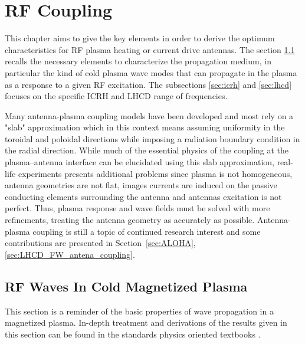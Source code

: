 \setchapterpreamble[u]{\margintoc}
\chapter{RF Coupling}
\label{chap:rf_coupling}


This chapter aims to give the key elements in order to derive the optimum characteristics for RF plasma heating or current drive antennas. The section \ref{sec:waves-in-plasma} recalls the necessary elements to characterize the propagation medium, in particular the kind of cold plasma wave modes that can propagate in the plasma as a response to a given RF excitation. The subsections \ref{sec:icrh} and \ref{sec:lhcd} focuses on the specific ICRH and LHCD range of frequencies. 

Many antenna-plasma coupling models have been developed and most rely on a "slab" approximation which in this context means assuming uniformity in the toroidal and poloidal directions while imposing a radiation boundary condition in the radial direction. While much of the essential physics of the coupling at the plasma–antenna interface can be elucidated using this slab approximation, real-life experiments presents additional problems since plasma is not homogeneous, antenna geometries are not flat, images currents are induced on the passive conducting elements surrounding the antenna and antennas excitation is not perfect. Thus, plasma response and wave fields must be solved with more refinements, treating the antenna geometry as accurately as possible. Antenna-plasma coupling is still a topic of continued research interest and some contributions are presented in Section~\ref{sec:ALOHA}, \ref{sec:LHCD_FW_antena_coupling}.


\section{RF Waves In Cold Magnetized Plasma}\label{sec:waves-in-plasma}
This section is a reminder of the basic properties of wave propagation in a magnetized plasma. In-depth treatment and derivations of the results given in this section can be found in the standards physics oriented textbooks . 

